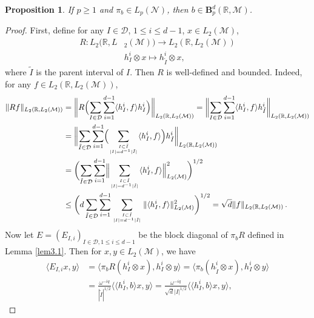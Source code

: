 \documentclass[oneside,english,a4wide]{amsart}
\numberwithin{equation}{section}
\numberwithin{figure}{section}
\theoremstyle{plain}
\theoremstyle{plain}
\newtheorem{proposition}[thm]{Proposition}
\theoremstyle{definition}
\theoremstyle{plain}
\theoremstyle{remark}
\theoremstyle{definition}
\theoremstyle{remark}
\theoremstyle{definition}
\newcommand{\M}{{\mathcal M}}
\newcommand{\8}{\infty}
\begin{document}
\begin{proposition}\label{Case 4}
	If $p\ge 1$ and $\pi_b\in L_p(\mathcal{N})$, then $b\in \pmb{B}_p^d(\mathbb{R},\M)$.
\end{proposition}
\begin{proof}
	First, define for any $I\in \mathcal{D}$, $1\le i\le d-1$, $x\in L_2(\mathcal{M})$,
	\begin{equation*}
		\begin{aligned}
			R:L_2(\mathbb{R},L{}&_2(\mathcal{M}))\to L_2(\mathbb{R},L_2(\mathcal{M}))\\&
			h_I^i\otimes x\mapsto h_{\tilde{I}}^i\otimes x,
		\end{aligned}
	\end{equation*}
	where $\tilde{I}$ is the parent interval of $I$. Then $R$ is well-defined and bounded. Indeed, for any $ f\in L_2(\mathbb{R},L_2(\mathcal{M}))$,
	\begin{equation}\label{Rnorm}
		\begin{aligned}
			\|Rf\|_{L_2(\mathbb{R},L_2(\mathcal{M}))}{}&=\biggl\|R\Bigl(\sum_{I\in \mathcal{D}}\sum_{i=1}^{d-1}\langle h_I^i,f\rangle h_I^i\Bigr)\biggr\|_{L_2(\mathbb{R},L_2(\mathcal{M}))}=\biggl\|\sum_{I\in \mathcal{D}}\sum_{i=1}^{d-1}\langle h_I^i,f\rangle h_{\tilde{I}}^i\biggr\|_{L_2(\mathbb{R},L_2(\mathcal{M}))}\\&=\biggl\|\sum_{\tilde{I}\in \mathcal{D}}\sum_{i=1}^{d-1}\Bigl(\sum_{I\subset \tilde{I}\atop |I|=d^{-1}|\tilde{I}|}\langle h_I^i,f\rangle\Bigr) h_{\tilde{I}}^i\biggr\|_{L_2(\mathbb{R},L_2(\mathcal{M}))}\\&=\biggl(\sum_{\tilde{I}\in \mathcal{D}}\sum_{i=1}^{d-1}\Bigl\|\sum_{I\subset \tilde{I}\atop |I|=d^{-1}|\tilde{I}|}\langle h_I^i,f\rangle \Bigr\|^2_{L_2(\mathcal{M})}\biggr)^{1/2}\\
			&\le \biggl(d\sum_{\tilde{I}\in \mathcal{D}}\sum_{i=1}^{d-1}\sum_{I\subset \tilde{I}\atop |I|=d^{-1}|\tilde{I}|}\|\langle h_I^i,f\rangle \|^2_{L_2(\mathcal{M})}\biggr)^{1/2}=\sqrt{d}\|f\|_{L_2(\mathbb{R},L_2(\mathcal{M}))}\,.
		\end{aligned}
	\end{equation}
	Now let $E=(E_{I,i})_{I\in\mathcal{D},1\le i\le d-1}$ be the block diagonal of $\pi_bR$ defined in Lemma \ref{lem3.1}. Then for $ x,y\in L_2(\mathcal{M})$, we have
	\begin{equation*}
		\begin{aligned}
			\langle E_{I,i}x,y\rangle{}&=\langle\pi_bR(h_I^i\otimes x),h_I^i\otimes y\rangle=\langle\pi_b(h_{\tilde{I}}^i\otimes x),h_I^i\otimes y\rangle\\&=\frac{\omega^{-iq}}{|\tilde{I}|^{1/2}}\langle \langle h_I^i,b\rangle x,y\rangle=\frac{\omega^{-iq}}{\sqrt{d}|I|^{1/2}}\langle \langle h_I^i,b\rangle x,y\rangle,

\end{aligned}
\end{equation*}
\end{proof}
\end{document}

